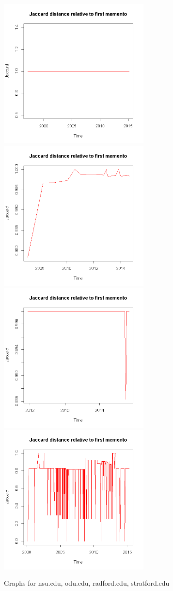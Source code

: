 \documentclass[12pt]{article} %
\begin{document}
\begin{figure}
\includegraphics[width=3in]{nsu-graph.png}
\includegraphics[width=3in]{odu-graph.png}
\includegraphics[width=3in]{rad-graph.png}
\includegraphics[width=3in]{strat-graph.png}
\caption{Graphs for nsu.edu, odu.edu, radford.edu, stratford.edu}
\end{figure}
\end{document}
